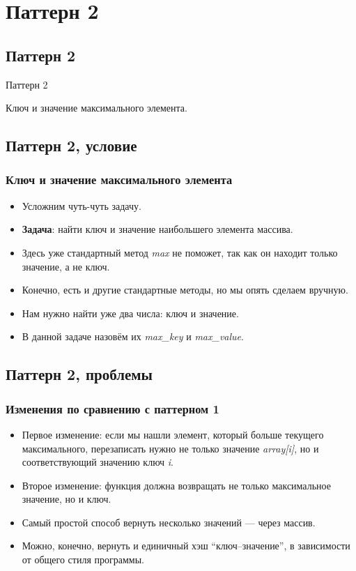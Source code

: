 \documentclass[compress,red]{beamer}
\begin{document}
\section{Паттерн 2}

\subsection{Паттерн 2}
\begin{frame}
	\begin{center}
		\Huge{Паттерн 2}
	\end{center}
	\begin{center}
		\Large{Ключ и значение максимального элемента.}
	\end{center}
\end{frame}

\subsection{Паттерн 2, условие}
\begin{frame}[fragile]
\frametitle{Ключ и значение максимального элемента}
		\begin{itemize}
			\item Усложним чуть-чуть задачу.
			\item \textbf{Задача}: найти ключ и значение наибольшего элемента массива.
			\item Здесь уже стандартный метод \emph{max} не поможет, так как он находит только значение, а не ключ.
			\item Конечно, есть и другие стандартные методы, но мы опять сделаем вручную.
			\item Нам нужно найти уже два числа: ключ и значение. 
			\item В данной задаче назовём их \emph{max\_key} и \emph{max\_value}.
		\end{itemize}
\end{frame}

\subsection{Паттерн 2, проблемы}
\begin{frame}[fragile]
\frametitle{Изменения по сравнению с паттерном 1}
		\begin{itemize}
			\item Первое изменение: если мы нашли элемент, который больше текущего максимального, перезаписать нужно не только значение \emph{array[i]}, но и соответствующий значению ключ \emph{i}.
			\item Второе изменение: функция должна возвращать не только максимальное значение, но и ключ.
			\item Самый простой способ вернуть несколько значений --- через массив.
			\item Можно, конечно, вернуть и единичный хэш ``ключ--значение'', в зависимости от общего стиля программы.
		\end{itemize}
\end{frame}
\end{document}
